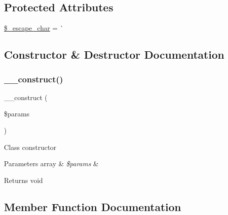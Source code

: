 \subsection*{Protected Attributes}
\begin{DoxyCompactItemize}
\item 
\mbox{\hyperlink{class_c_i___d_b__mysql__driver_aaec2fb0112850159063a8e47ad3aed6e}{\$\+\_\+escape\+\_\+char}} = \textquotesingle{}\`{}\textquotesingle{}
\end{DoxyCompactItemize}


\subsection{Constructor \& Destructor Documentation}
\mbox{\label{class_c_i___d_b__mysql__driver_a9162320adff1a1a4afd7f2372f753a3e}} 
\subsubsection{\texorpdfstring{\+\_\+\+\_\+construct()}{\_\_construct()}}
{\footnotesize\ttfamily \+\_\+\+\_\+construct (\begin{DoxyParamCaption}\item[{}]{\$params }\end{DoxyParamCaption})}

Class constructor


\begin{DoxyParams}[1]{Parameters}
array & {\em \$params} & \\
\hline
\end{DoxyParams}
\begin{DoxyReturn}{Returns}
void 
\end{DoxyReturn}


\subsection{Member Function Documentation}
\mbox{\label{class_c_i___d_b__mysql__driver_a4d9082658000e5ede8312067c6dda9db}} 
